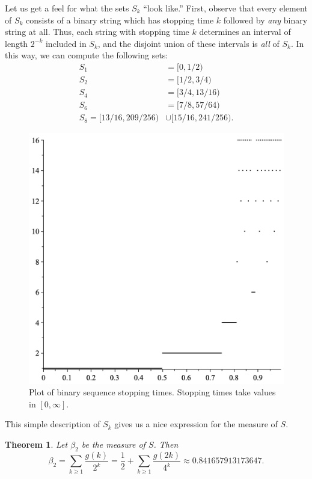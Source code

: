 \documentclass[12pt]{article}
\newtheorem{theorem}{Theorem}
\theoremstyle{definition}
\begin{document}
Let us get a feel for what the sets $S_k$ ``look like.'' First, observe that
every element of $S_k$ consists of a binary string which has stopping time $k$
followed by \emph{any} binary string at all. Thus, each string with stopping
time $k$ determines an interval of length $2^{-k}$ included in $S_k$, and the
disjoint union of these intervals is \emph{all} of $S_k$. In this way, we can
compute the following sets:
\begin{align*}
    S_1 &= [0, 1/2) \\
    S_2 &= [1/2, 3/4) \\
    S_4 &= [3/4, 13/16) \\
    S_6 &= [7/8, 57/64) \\
    S_8 = [13/16, 209/256) &\cup [15/16, 241/256).
\end{align*}

\begin{figure}
\includegraphics[width=\textwidth]{fig1.png}
\caption{Plot of binary sequence stopping times. Stopping times take values in $[0,\infty].$}
\end{figure}

This simple description of $S_k$ gives us a nice expression for the measure of
$S$.

\begin{theorem}
    Let $\beta_2$ be the measure of $S$. Then
    \begin{equation*}
        \beta_2 = \sum_{k \geq 1} \frac{g(k)}{2^k} = \frac{1}{2} + \sum_{k \geq 1} \frac{g(2k)}{4^k}
        \approx 0.841657913173647.
    \end{equation*}
\end{theorem}
\end{document}
